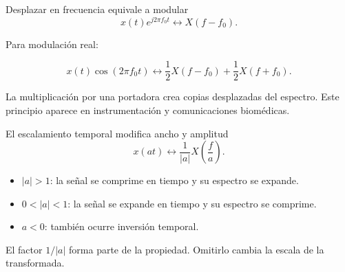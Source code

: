 \documentclass[
  ignorenonframetext,
  aspectratio=169,
  spanish,
]{beamer}
\providecommand{\tightlist}{%
  \setlength{\itemsep}{0pt}\setlength{\parskip}{0pt}}
\begin{document}
\begin{frame}{Desplazar en frecuencia equivale a modular}
  \protect{}\label{desplazar-en-frecuencia-equivale-a-modular}
  \[x(t)e^{j2\pi f_0t}\longleftrightarrow X(f-f_0).\]

  Para modulación real:

  \[x(t)\cos(2\pi f_0t)
    \longleftrightarrow \frac{1}{2}X(f-f_0)+\frac{1}{2}X(f+f_0).\]

  \begin{tcolorbox}[enhanced jigsaw, arc=.35mm, bottomrule=.15mm, bottomtitle=1mm, breakable, colback=white, colbacktitle=quarto-callout-tip-color!10!white, colframe=quarto-callout-tip-color-frame, coltitle=black, left=2mm, leftrule=.75mm, opacityback=0, opacitybacktitle=0.6, rightrule=.15mm, title=\textcolor{quarto-callout-tip-color}{\faLightbulb}\hspace{0.5em}{Tip}, titlerule=0mm, toprule=.15mm, toptitle=1mm]

    La multiplicación por una portadora crea copias desplazadas del
    espectro. Este principio aparece en instrumentación y comunicaciones
    biomédicas.

  \end{tcolorbox}
\end{frame}

\begin{frame}{El escalamiento temporal modifica ancho y amplitud}
  \protect{}\label{el-escalamiento-temporal-modifica-ancho-y-amplitud}
  \[x(at)\longleftrightarrow \frac{1}{|a|}X\left(\frac{f}{a}\right).\]

  \begin{itemize}
    \tightlist
    \item
          \(|a|>1\): la señal se comprime en tiempo y su espectro se expande.
    \item
          \(0<|a|<1\): la señal se expande en tiempo y su espectro se comprime.
    \item
          \(a<0\): también ocurre inversión temporal.
  \end{itemize}

  \begin{tcolorbox}[enhanced jigsaw, arc=.35mm, bottomrule=.15mm, bottomtitle=1mm, breakable, colback=white, colbacktitle=quarto-callout-warning-color!10!white, colframe=quarto-callout-warning-color-frame, coltitle=black, left=2mm, leftrule=.75mm, opacityback=0, opacitybacktitle=0.6, rightrule=.15mm, title=\textcolor{quarto-callout-warning-color}{\faExclamationTriangle}\hspace{0.5em}{Advertencia}, titlerule=0mm, toprule=.15mm, toptitle=1mm]

    El factor \(1/|a|\) forma parte de la propiedad. Omitirlo cambia la
    escala de la transformada.

  \end{tcolorbox}
\end{frame}
\end{document}
